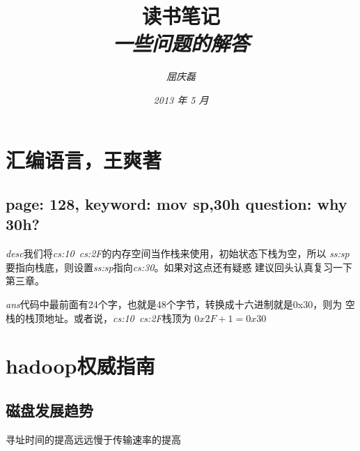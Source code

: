 \documentclass{article}
\begin{document}
\title{
  {\huge \textsf{读书笔记}\\\smallskip}
  {\small \textit{一些问题的解答}}
}

\author{\textit{屈庆磊}\\[2mm]
       }

\date{\textit{2013 年 5 月}}

\maketitle
\newpage
\begin{multicols}{2}
\tableofcontents
\end{multicols}
\newpage 

\section{汇编语言，王爽著}
\subsection{page: 128, keyword: mov sp,30h question: why 30h?}
\emph{desc}我们将\textit{cs:10~cs:2F}的内存空间当作栈来使用，初始状态下栈为空，所以
\textit{ss:sp}要指向栈底，则设置\textit{ss:sp}指向\textit{cs:30}。如果对这点还有疑惑
建议回头认真复习一下第三章。

\indent\emph{ans}代码中最前面有24个字，也就是48个字节，转换成十六进制就是0x30，则为
空栈的栈顶地址。或者说，\textit{cs:10~cs:2F}栈顶为 \bf{$0x2F + 1 = 0x30$}

\section{hadoop权威指南}
\subsection{磁盘发展趋势}
寻址时间的提高远远慢于传输速率的提高
\end{document}

